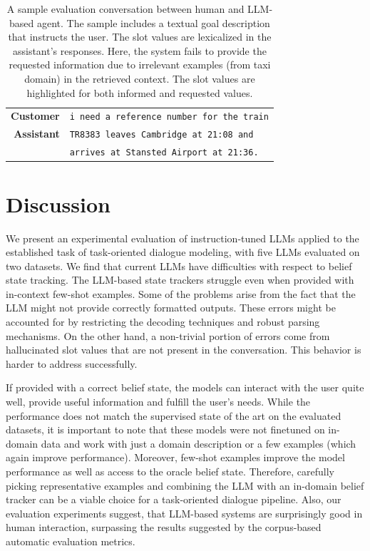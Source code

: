 \begin{table}[tp]
\begin{tabular}{r|l}
         \textbf{Customer} & \texttt{i need a {\color{orange!50!yellow!90!black!100!}reference number} for the train} \\
         \textbf{Assistant} & \texttt{{\color{red!100!yellow!90!black!100!}TR8383 leaves Cambridge at 21:08 and}} \\
         & \texttt{{\color{red!100!yellow!90!black!100!}arrives at Stansted Airport at 21:36}.}\\
         \bottomrule
    \end{tabular}
    \caption{A sample evaluation conversation between human and LLM-based agent. The sample includes a textual goal description that instructs the user. The slot values are lexicalized in the assistant's responses. Here, the system {\color{red!100!yellow!90!black!100!} fails} to provide the requested information due to irrelevant examples (from taxi domain) in the retrieved context. The slot values are highlighted for both {\color{cyan!80!yellow!80!black!100 }informed} and {\color{orange!50!yellow!90!black!100!}requested} values.}
    \label{07:tab:human-2}
\end{table}
\section{Discussion}

We present an experimental evaluation of instruction-tuned LLMs applied to the established task of task-oriented dialogue modeling, with five LLMs evaluated on two datasets.
We find that current LLMs have difficulties with respect to belief state tracking.
The LLM-based state trackers struggle even when provided with in-context few-shot examples.
Some of the problems arise from the fact that the LLM might not provide correctly formatted outputs.
These errors might be accounted for by restricting the decoding techniques and robust parsing mechanisms.
On the other hand, a non-trivial portion of errors come from hallucinated slot values that are not present in the conversation.
This behavior is harder to address successfully.

If provided with a correct belief state, the models can interact with the user quite well, provide useful information and fulfill the user's needs.
While the performance does not match the supervised state of the art on the evaluated datasets, it is important to note that these models were not finetuned on in-domain data and work with just a domain description or a few examples (which again improve performance). 
Moreover, few-shot examples improve the model performance as well as access to the oracle belief state.
Therefore, carefully picking representative examples and combining the LLM with an in-domain belief tracker can be a viable choice for a task-oriented dialogue pipeline.
Also, our evaluation experiments suggest, that LLM-based systems are surprisingly good in human interaction, surpassing the results suggested by the corpus-based automatic evaluation metrics.
